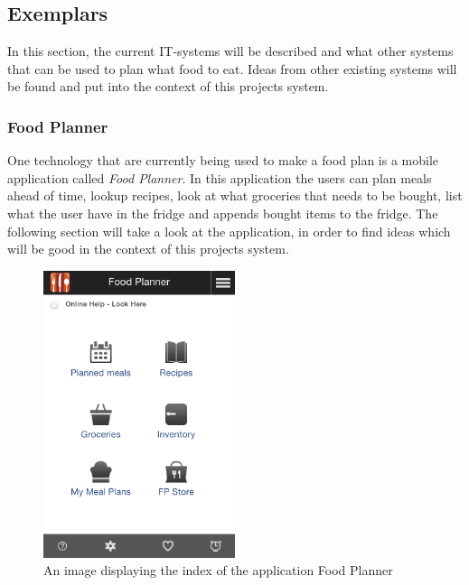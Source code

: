 \subsection{Exemplars}
In this section, the current IT-systems will be described and what other systems that can be used to plan what food to eat.
Ideas from other existing systems will be found and put into the context of this projects system. 

\subsubsection{Food Planner}
One technology that are currently being used to make a food plan is a mobile application called \textit{Food Planner}.
In this application the users can plan meals ahead of time, lookup recipes, look at what groceries that needs to be bought, list what the user have in the fridge and appends bought items to the fridge.
The following section will take a look at the application, in order to find ideas which will be good in the context of this projects system.

\begin{figure}[H]
    \centering
    \includegraphics[width=0.5\textwidth]{Grafik/FoodPlanner/index}
    \caption{An image displaying the index of the application Food Planner}
    \label{FoodPlannerIndex}
\end{figure}

